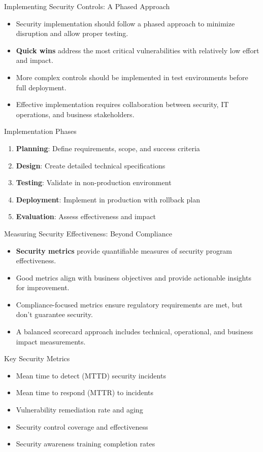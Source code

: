 \documentclass{beamer}
\begin{document}
\begin{frame}{Implementing Security Controls: A Phased Approach}
\begin{itemize}
    \item Security implementation should follow a phased approach to minimize disruption and allow proper testing.
    \item \textbf{Quick wins} address the most critical vulnerabilities with relatively low effort and impact.
    \item More complex controls should be implemented in test environments before full deployment.
    \item Effective implementation requires collaboration between security, IT operations, and business stakeholders.
\end{itemize}

\begin{block}{Implementation Phases}
\begin{enumerate}
    \item \textbf{Planning}: Define requirements, scope, and success criteria
    \item \textbf{Design}: Create detailed technical specifications
    \item \textbf{Testing}: Validate in non-production environment
    \item \textbf{Deployment}: Implement in production with rollback plan
    \item \textbf{Evaluation}: Assess effectiveness and impact
\end{enumerate}
\end{block}
\end{frame}

\begin{frame}{Measuring Security Effectiveness: Beyond Compliance}
\begin{itemize}
    \item \textbf{Security metrics} provide quantifiable measures of security program effectiveness.
    \item Good metrics align with business objectives and provide actionable insights for improvement.
    \item Compliance-focused metrics ensure regulatory requirements are met, but don't guarantee security.
    \item A balanced scorecard approach includes technical, operational, and business impact measurements.
\end{itemize}

\begin{alertblock}{Key Security Metrics}
\begin{itemize}
    \item Mean time to detect (MTTD) security incidents
    \item Mean time to respond (MTTR) to incidents
    \item Vulnerability remediation rate and aging
    \item Security control coverage and effectiveness
    \item Security awareness training completion rates
\end{itemize}
\end{alertblock}
\end{frame}
\end{document}
